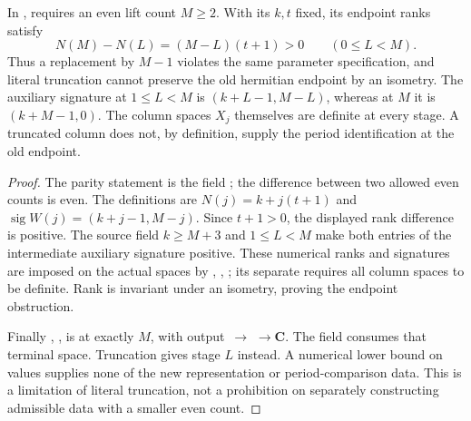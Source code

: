 \begin{proposition}\label{DP27}
In ,  requires an even lift count $M\ge2$. With its $k,t$ fixed, its endpoint ranks satisfy
\[
 N(M)-N(L)=(M-L)(t+1)>0\qquad(0\le L<M).
\]
Thus a replacement by $M-1$ violates the same parameter specification, and literal truncation cannot preserve the old hermitian endpoint by an isometry. The auxiliary signature at $1\le L<M$ is $(k+L-1,M-L)$, whereas at $M$ it is $(k+M-1,0)$. The column spaces $X_j$ themselves are definite at every stage. A truncated column does not, by definition, supply the period identification at the old endpoint.
\end{proposition}
\begin{proof}
The parity statement is the field ; the difference between two allowed even counts is even. The definitions are $N(j)=k+j(t+1)$ and $\operatorname{sig}W(j)=(k+j-1,M-j)$. Since $t+1>0$, the displayed rank difference is positive. The source field $k\ge M+3$ and $1\le L<M$ make both entries of the intermediate auxiliary signature positive. These numerical ranks and signatures are imposed on the actual spaces by , , ; its separate  requires all column spaces to be definite. Rank is invariant under an isometry, proving the endpoint obstruction.

Finally , , is  at exactly $M$, with output \,$\to$\,\,$\to\mathbf C$. The field  consumes that terminal space. Truncation gives stage $L$ instead. A numerical lower bound on values supplies none of the new representation or period-comparison data. This is a limitation of literal truncation, not a prohibition on separately constructing admissible data with a smaller even count.
\end{proof}
